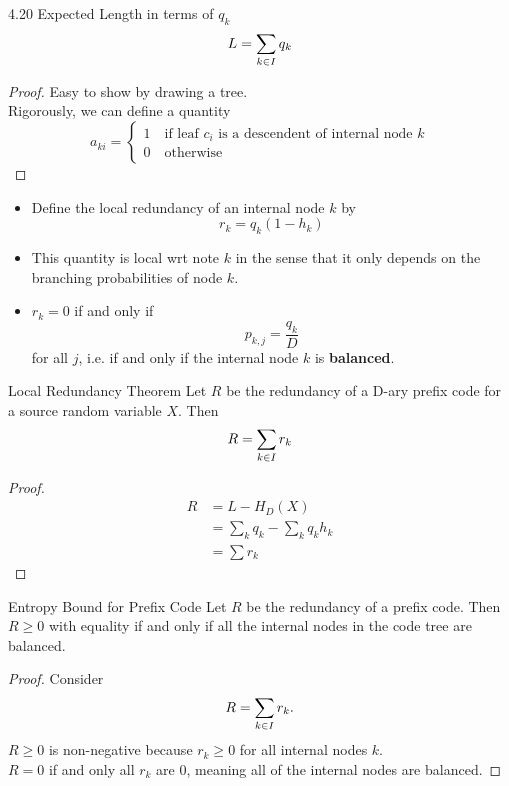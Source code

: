 \documentclass[../main.tex]{subfiles}
\begin{document}
 \begin{bbox}{4.20 Expected Length in terms of $q_k$}
     \[
     L = \sum_{k\in I}q_k
     \]
     \begin{proof}
         Easy to show by drawing a tree.\\
         Rigorously, we can define a quantity \[a_{ki}=\begin{cases}
             1 \quad \text{if leaf $c_i$ is a descendent of internal node $k$}\\
             0 \quad \text{otherwise}
         \end{cases}\]
     \end{proof}
 \end{bbox}
 \begin{itemize}
     \item Define the local redundancy of an internal node $k$ by \[
     r_k = q_k(1-h_k)
     \]
     \item This quantity is local wrt note $k$ in the sense that it only depends on the branching probabilities of node $k$.
     \item $r_k=0$ if and only if \[
     p_{k,j}=\frac{q_k}{D}
     \] for all $j$, i.e. if and only if the internal node $k$ is \textbf{balanced}.
 \end{itemize}
 \begin{bbox}{Local Redundancy Theorem}
     Let $R$ be the redundancy of a D-ary prefix code for a source random variable $X$. Then \[
     R=\sum_{k\in I}r_k
     \]
     \begin{proof}
         \begin{align*}
             R &= L - H_D(X)\\
             &= \sum_{k}q_k - \sum_{k}q_kh_k\\
             &= \sum r_k
         \end{align*}
     \end{proof}
 \end{bbox}
\begin{bbox}{Entropy Bound for Prefix Code}
Let $R$ be the redundancy of a prefix code. Then $R\geq 0$ with equality if and only if all the internal nodes in the code tree are balanced.
\begin{proof}
    Consider \[
    R=\sum_{k\in I}r_k.
    \]
    $R \geq 0$ is non-negative because $r_k\geq 0$ for all internal nodes $k$.\\
    $R=0$ if and only all $r_k$ are $0$, meaning all of the internal nodes are balanced.
\end{proof}
\end{bbox}
\end{document}
